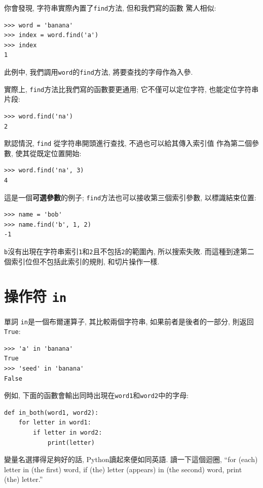 \documentclass[10pt]{book}
\begin{document}
你會發現, 字符串實際內置了{\tt find}方法, 但和我們寫的函數
驚人相似:

\begin{verbatim}
>>> word = 'banana'
>>> index = word.find('a')
>>> index
1
\end{verbatim}
%
此例中, 我們調用{\tt word}的{\tt find}方法, 將要查找的字母作為入參. 

實際上, {\tt find}方法比我們寫的函數要更通用;
它不僅可以定位字符, 也能定位字符串片段:

\begin{verbatim}
>>> word.find('na')
2
\end{verbatim}
%
默認情況, {\tt find} 從字符串開頭進行查找, 不過也可以給其傳入索引值
作為第二個參數, 
使其從既定位置開始:

\begin{verbatim}
>>> word.find('na', 3)
4
\end{verbatim}
%
這是一個{\bf 可選參數}的例子;
{\tt find}方法也可以接收第三個索引參數, 以標識結束位置:

\begin{verbatim}
>>> name = 'bob'
>>> name.find('b', 1, 2)
-1
\end{verbatim}
%
{\tt b}沒有出現在字符串索引{\tt 1}和{\tt 2}且不包括{\tt 2}的範圍內, 
所以搜索失敗. 
而這種到達第二個索引位但不包括此索引的規則, 和切片操作一樣. 


\section{操作符 {\tt in}}
\label{inboth}

單詞 {\tt in}是一個布爾運算子, 其比較兩個字符串, 
如果前者是後者的一部分, 
則返回{\tt True}:

\begin{verbatim}
>>> 'a' in 'banana'
True
>>> 'seed' in 'banana'
False
\end{verbatim}
%
例如, 下面的函數會輸出同時出現在{\tt word1}和{\tt word2}中的字母:

\begin{verbatim}
def in_both(word1, word2):
    for letter in word1:
        if letter in word2:
            print(letter)
\end{verbatim}
%

變量名選擇得足夠好的話, Python讀起來便如同英語. 
讀一下這個迴圈, ``for (each) letter in (the first) word, if (the) letter 
(appears) in (the second) word, print (the) letter.''
\end{document}

